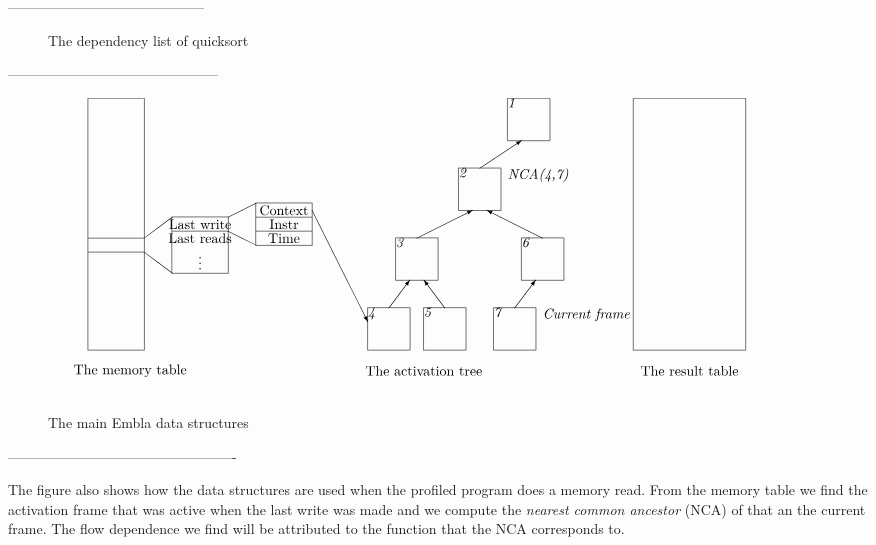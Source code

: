 ------------------------------------------

\begin{figure} 
\small

\caption{The dependency list of quicksort}
\label{fquickl}
\end{figure}

---------------------------------------------

\begin{figure*}
\small
\hrulefill
\[
\begin{picture}(500,210)(-30,0)
\put(-30,30){\framebox(40,180)[t]{\ }}
\put(-30,100){\line(1,0){40}}
\put(-30,110){\line(1,0){40}}
\put(-30,10){\makebox(60,10){The memory table}}
\put(10,110){\line(4,3){20}}
\put(10,100){\line(4,-3){20}}
\put(30,85){\framebox(40,40){\ }}
\put(30,115){\line(1,0){40}}
\put(30,115){\makebox(40,10){Last write}}
\put(30,105){\makebox(40,10){Last reads}}
\put(30,90){\makebox(40,10){\vdots}}
\put(70,125){\line(2,1){20}}
\put(70,115){\line(2,-1){20}}
\put(90,105){\framebox(40,30){\ }}
\put(90,125){\line(1,0){40}}
\put(90,115){\line(1,0){40}}
\put(90,105){\makebox(40,10){Time}}
\put(90,115){\makebox(40,10){Instr}}
\put(90,125){\makebox(40,10){Context}}
\put(130,130){\vector(1,-2){40}}
\put(270,180){\framebox(30,30)[tl]{\it 1}}
\put(235,130){\framebox(30,30)[tl]{\it 2}} \put(250,160){\vector(3,2){30}}
\put(270,150){\makebox(50,10)[l]{\it NCA(4,7)}}
\put(190,80){\framebox(30,30)[tl]{\it 3}} \put(205,110){\vector(2,1){40}}
\put(280,80){\framebox(30,30)[tl]{\it 6}} \put(295,110){\vector(-2,1){40}}
\put(170,30){\framebox(30,30)[tl]{\it 4}} \put(185,60){\vector(3,4){15}}
\put(210,30){\framebox(30,30)[tl]{\it 5}} \put(225,60){\vector(-3,4){15}}
\put(260,30){\framebox(30,30)[tl]{\it 7}} \put(275,60){\vector(3,4){15}}
\put(295,50){\makebox(50,10)[l]{\it Current frame}}
\put(170,10){\makebox(80,10){The activation tree}}
\put(360,30){\framebox(80,180){\ }}
\put(360,10){\makebox(80,10){The result table}}

\end{picture}
\]
\hrulefill
\caption{The main Embla data structures}
\label{fembladata}
\end{figure*}


-------------------------------------------------

The figure also shows how the data structures are used when the
profiled program does a memory read. From the memory table we find the
activation frame that was active when the last write was made and we
compute the {\em nearest common ancestor} (NCA) of that an the
current frame. The flow dependence we find will be attributed to the
function that the NCA corresponds to. 

